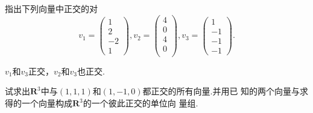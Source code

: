 ﻿\documentclass{book} \usepackage{exsheets} \usepackage{xeCJK}
\begin{document}
\begin{question}
  指出下列向量中正交的对
$$
v_1=
\begin{pmatrix}
  1\\
  2\\
  -2\\
  1
\end{pmatrix},v_{2}=
\begin{pmatrix}
  4\\
  0\\
  4\\
  0\\
\end{pmatrix},v_3=
\begin{pmatrix}
  1\\
  -1\\
  -1\\
  -1
\end{pmatrix}.
$$
\end{question}
\begin{solution}
  $v_1$和$v_3$正交，$v_2$和$v_3$也正交.
\end{solution}
\begin{question}
  试求出$\mathbf{R}^3$中与$(1,1,1)$和$(1,-1,0)$都正交的所有向量.并用已
  知的两个向量与求得的一个向量构成$\mathbf{R}^3$的一个彼此正交的单位向
  量组.
\end{question}
\end{document}
